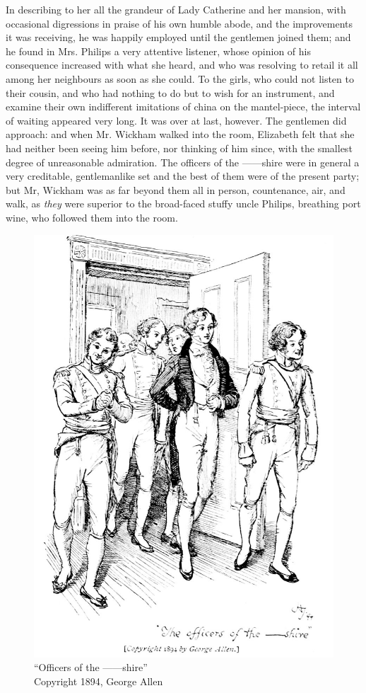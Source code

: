 In describing to her all the grandeur of Lady Catherine and her mansion, with occasional digressions in praise of his own humble abode, and the improvements it was receiving, he was happily employed until the gentlemen joined them; and he found in Mrs. Philips a very attentive listener, whose opinion of his consequence increased with what she heard, and who was resolving to retail it all among her neighbours as soon as she could. To the girls, who could not listen to their cousin, and who had nothing to do but to wish for an instrument, and examine their own indifferent imitations of china on the mantel-piece, the interval of waiting appeared very long. It was over at last, however. The gentlemen did approach: and when Mr. Wickham walked into the room, Elizabeth felt that she had neither been seeing him before, nor thinking of him since, with the smallest degree of unreasonable admiration. The officers of the ------shire were in general a very creditable, gentlemanlike set and the best of them were of the present party; but Mr, Wickham was as far beyond them all in person, countenance, air, and walk, as \textit{they} were superior to the broad-faced stuffy uncle Philips, breathing port wine, who followed them into the room.


\begin{figure}[htbp]
    \centering
    \includegraphics[width=\textwidth]{illustrations/i_126.jpg}
    \caption{“Officers of the ------shire”\\ Copyright 1894, George Allen}
    \label{fig:image}
\end{figure}


